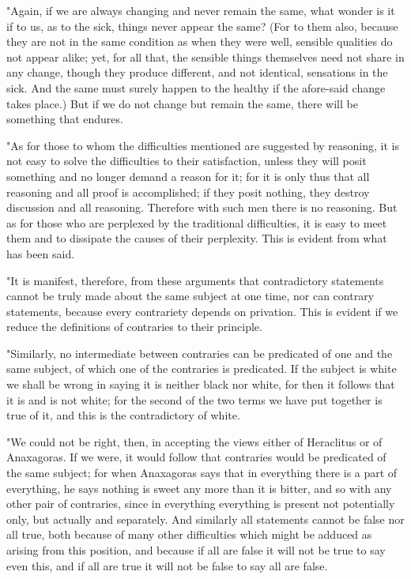 "Again, if we are always changing and never remain the same, what
wonder is it if to us, as to the sick, things never appear the same?
(For to them also, because they are not in the same condition as when
they were well, sensible qualities do not appear alike; yet, for all
that, the sensible things themselves need not share in any change,
though they produce different, and not identical, sensations in the
sick. And the same must surely happen to the healthy if the afore-said
change takes place.) But if we do not change but remain the same,
there will be something that endures. 

"As for those to whom the difficulties mentioned are suggested by
reasoning, it is not easy to solve the difficulties to their satisfaction,
unless they will posit something and no longer demand a reason for
it; for it is only thus that all reasoning and all proof is accomplished;
if they posit nothing, they destroy discussion and all reasoning.
Therefore with such men there is no reasoning. But as for those who
are perplexed by the traditional difficulties, it is easy to meet
them and to dissipate the causes of their perplexity. This is evident
from what has been said. 

"It is manifest, therefore, from these arguments that contradictory
statements cannot be truly made about the same subject at one time,
nor can contrary statements, because every contrariety depends on
privation. This is evident if we reduce the definitions of contraries
to their principle. 

"Similarly, no intermediate between contraries can be predicated of
one and the same subject, of which one of the contraries is predicated.
If the subject is white we shall be wrong in saying it is neither
black nor white, for then it follows that it is and is not white;
for the second of the two terms we have put together is true of it,
and this is the contradictory of white. 

"We could not be right, then, in accepting the views either of Heraclitus
or of Anaxagoras. If we were, it would follow that contraries would
be predicated of the same subject; for when Anaxagoras says that in
everything there is a part of everything, he says nothing is sweet
any more than it is bitter, and so with any other pair of contraries,
since in everything everything is present not potentially only, but
actually and separately. And similarly all statements cannot be false
nor all true, both because of many other difficulties which might
be adduced as arising from this position, and because if all are false
it will not be true to say even this, and if all are true it will
not be false to say all are false. 

